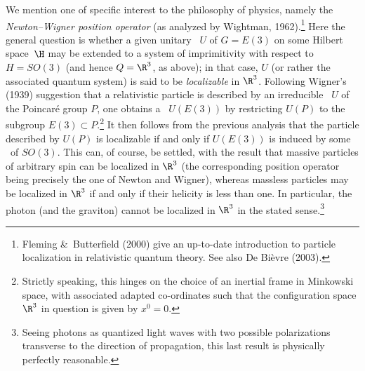 \documentclass[12pt,titlepage]{article}
\newcommand{\Hs}{Hilbert space} \newcommand{\Bs}{Banach space}
\begin{document}
 We mention one of specific interest to the philosophy of physics, namely the {\it Newton--Wigner position operator} (as analyzed by Wightman, 1962).\footnote{Fleming \&\  Butterfield (2000) give an up-to-date introduction to particle localization in relativistic quantum theory. See also De Bi\`{e}vre (2003).}  
Here the general question is whether a given unitary \rep\ $U$ of $G=E(3)$ on some \Hs\ $\H$ may be extended to a system of imprimitivity with respect to $H=SO(3)$ (and hence
$Q=\R^3$, as above); in that case, $U$ (or rather the associated quantum system) is  said to be {\it localizable} in $\R^3$.  Following Wigner's (1939) suggestion that a relativistic  particle is described by an irreducible \rep\ $U$ of the Poincar\'{e} group $P$, one obtains a \rep\ $U(E(3))$ by restricting
$U(P)$ to the subgroup $E(3)\subset P$.\footnote{Strictly speaking, this hinges on the choice of an inertial frame in Minkowski space, with associated adapted co-ordinates such that the configuration space $\R^3$ in question is given by $x^0=0$.}  It then follows from the previous analysis that the particle described by $U(P)$ is localizable if and only if $U(E(3))$ is induced by some \rep\ of $SO(3)$. This can, of course, be settled, with the result that massive particles of arbitrary spin can be localized in $\R^3$ (the corresponding position operator being precisely the one of Newton and Wigner), whereas
 massless particles may be localized in $\R^3$ if and only if their helicity is less than one. In particular,  the photon (and the graviton) cannot be localized
in $\R^3$ in the stated sense.\footnote{
Seeing photons as quantized light waves with two possible polarizations
transverse to the direction of propagation, this last result is physically
perfectly reasonable. }
\end{document}
